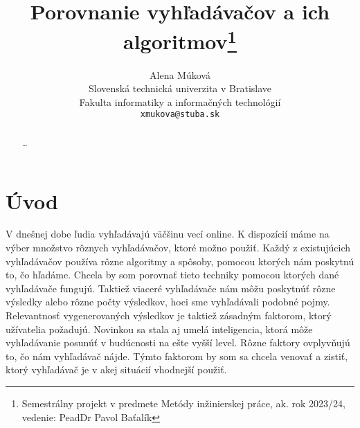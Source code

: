 \documentclass[10pt,twoside,slovak,a4paper]{article}
\title{Porovnanie vyhľadávačov a ich algoritmov\thanks{Semestrálny projekt v predmete Metódy inžinierskej práce, ak. rok 2023/24, vedenie: PeadDr Pavol Baťalík}} %
\author{Alena Múková\\[2pt]
	{\small Slovenská technická univerzita v Bratislave}\\
	{\small Fakulta informatiky a informačných technológií}\\
	{\small \texttt{xmukova@stuba.sk}}
	}
\date{\small  } %
\begin{document}
\maketitle
\begin{abstract}
\ldots
\end{abstract}
\section{Úvod}

V dnešnej dobe ľudia vyhľadávajú väčšinu vecí online. K dispozícií máme na výber množstvo rôznych vyhľadávačov, ktoré možno použiť. Každý z existujúcich vyhľadávačov používa rôzne algoritmy a spôsoby, pomocou ktorých nám poskytnú to, čo hľadáme.  Chcela by som porovnať tieto techniky pomocou ktorých dané vyhľadávače fungujú. Taktiež viaceré vyhľadávače nám môžu poskytnúť rôzne výsledky alebo rôzne počty výsledkov, hoci sme vyhľadávali podobné pojmy. Relevantnosť vygenerovaných výsledkov je taktiež zásadným faktorom, ktorý užívatelia požadujú. Novinkou sa stala aj umelá inteligencia, ktorá môže vyhľadávanie posunúť v budúcnosti na ešte vyšší level. Rôzne faktory ovplyvňujú to, čo nám vyhľadávač nájde. Týmto faktorom by som sa chcela venovať a zistiť, ktorý vyhľadávač je v akej situácií vhodnejší použiť.






\cite{4621535}

\cite{dujmovic2006evaluation}

\cite{8918837}
\end{document}
